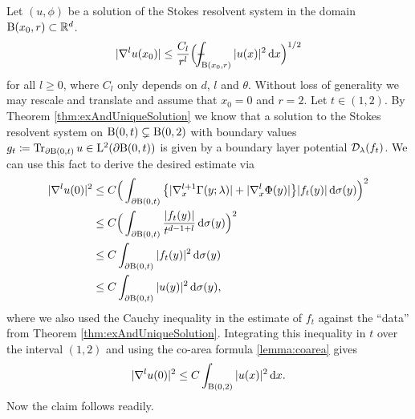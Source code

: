 \begin{rem}
  Let $(u,\phi)$ be a solution of the Stokes resolvent system in the domain $\mathrm{B}(x_0, r) \subset \mathbb{R}^d$.
  \begin{align}
    \label{eq:interiorEstimateDoubleLayer}
    |\nabla^l u(x_0) | \leq \frac{C_l}{r^l} \Big( \dashint_{\BB(x_0, r)} |u(x)|^2 \d x \Big)^{1/2}
  \end{align}
  for all $l \geq 0$, where $C_l$ only depends on $d$, $l$ and $\theta$.
  Without loss of generality we may rescale and translate and assume that $x_0 = 0$ and $r = 2$.
  Let $t \in (1,2)$. By Theorem \ref{thm:exAndUniqueSolution} we know that a solution to the Stokes resolvent system on $\mathrm{B}(0, t) \subsetneq \mathrm{B}(0,2)$ with boundary values $g_t \coloneqq \operatorname{Tr}_{\partial\mathrm{B}(0,t)} u \in \mathrm{L}^2(\partial\mathrm{B}(0,t))$ is given by a boundary layer potential $\mathcal{D}_\lambda(f_t)$.
  We can use this fact to derive the desired estimate via
  \begin{align*}
    |\nabla^l u(0)|^2 
    &\leq C \Big( \int_{\partial \mathrm{B}(0, t)} \big\{ |\nabla_x^{l+1} \Gamma(y; \lambda)|  + |\nabla_x^l \Phi(y) | \big\} |f_t(y)| \, {\operatorname{d}\!{\sigma}}(y)\Big)^2 \\
    &\leq  C \Big( \int_{\partial \mathrm{B}(0,t)} \frac{|f_t(y)|}{t^{d - 1 + l}}  \, {\operatorname{d}\!{\sigma}}(y)\Big)^2 \\
    &\leq  C \int_{\partial \mathrm{B}(0,t)} |f_t(y)|^2  \, {\operatorname{d}\!{\sigma}}(y) \\
    &\leq C \int_{\partial \mathrm{B}(0,t)} |u(y)|^2 \, {\operatorname{d}\!{\sigma}}(y), 
  \end{align*}
  where we also used the Cauchy inequality in the estimate of $f_t$ against the ``data'' from Theorem \ref{thm:exAndUniqueSolution}.
  Integrating this inequality in $t$ over the interval $(1,2)$ and using the co-area formula \ref{lemma:coarea} gives 
  \begin{align*}
    |\nabla^l u(0)|^2 \leq C \int_{\mathrm{B}(0,2)} |u(x)|^2 \, {\operatorname{d}\!{x}}.
  \end{align*}
  Now the claim follows readily.
\end{rem}

